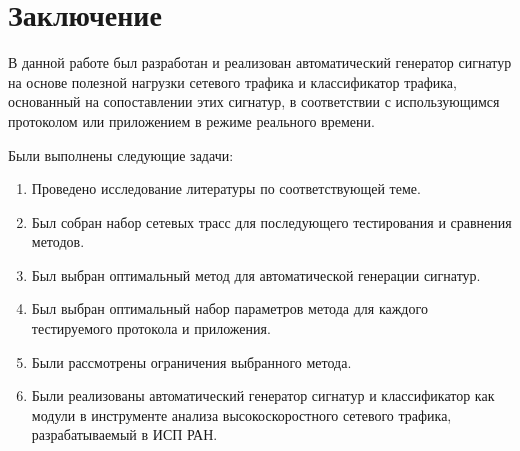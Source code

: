 \section{Заключение}
\label{sec:Section5} 

В данной работе был разработан и реализован автоматический генератор сигнатур на основе полезной нагрузки сетевого трафика
и классификатор трафика, основанный на сопоставлении этих сигнатур, в соответствии с использующимся протоколом или приложением в режиме реального времени.

Были выполнены следующие задачи:
\begin{enumerate}
    \item Проведено исследование литературы по соответствующей теме.
    \item Был собран набор сетевых трасс для последующего тестирования и сравнения методов.
    \item Был выбран оптимальный метод для автоматической генерации сигнатур.
    \item Был выбран оптимальный набор параметров метода для каждого тестируемого протокола и приложения.
    \item Были рассмотрены ограничения выбранного метода.
    \item Были реализованы автоматический генератор сигнатур и классификатор как модули
    в инструменте анализа высокоскоростного сетевого трафика, разрабатываемый в ИСП РАН.
\end{enumerate}

\newpage
